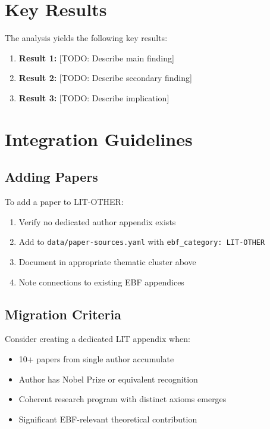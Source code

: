 
\section{Key Results}
\label{sec:results}

The analysis yields the following key results:

\begin{enumerate}
    \item \textbf{Result 1:} [TODO: Describe main finding]
    \item \textbf{Result 2:} [TODO: Describe secondary finding]
    \item \textbf{Result 3:} [TODO: Describe implication]
\end{enumerate}

\section{Integration Guidelines}
\label{sec:ot-guidelines}

\subsection{Adding Papers}

To add a paper to LIT-OTHER:
\begin{enumerate}
    \item Verify no dedicated author appendix exists
    \item Add to \texttt{data/paper-sources.yaml} with \texttt{ebf\_category: LIT-OTHER}
    \item Document in appropriate thematic cluster above
    \item Note connections to existing EBF appendices
\end{enumerate}

\subsection{Migration Criteria}

Consider creating a dedicated LIT appendix when:
\begin{itemize}
    \item 10+ papers from single author accumulate
    \item Author has Nobel Prize or equivalent recognition
    \item Coherent research program with distinct axioms emerges
    \item Significant EBF-relevant theoretical contribution
\end{itemize}

